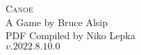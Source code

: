 



\begin{center}
    \Huge \textsc{Canoe}\\
    \LARGE A Game by Bruce Alsip\\
    \large PDF Compiled by Niko Lepka\\
    $v.2022.8.10.0$
\end{center}









